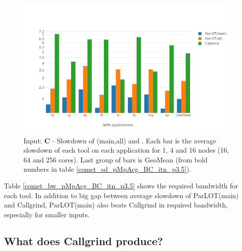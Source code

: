 \begin{figure}[!t]
\centering
\includegraphics[width=6in]{figs.comet/comet_chartAvg_sd_C_p3_5.png}
\caption{ Input: \textbf{C} - Slowdown of \parlot(main,all) and \callgrind. Each bar is the average slowdown of each tool on each application for 1, 4 and 16 nodes (16, 64 and 256 cores). Last group of bars is GeoMean (from bold numbers in table \ref{comet_sd_pMpAcg_BC_itn_p3.5}). 
}
\label{comet_chartAvg_sd_C_p3_5}
\end{figure}





Table \ref{comet_bw_pMpAcg_BC_itn_p3.5} shows the required bandwidth for each tool. In addition to big gap between average slowdown of ParLOT(main) and Callgrind, ParLOT(main) also beats Callgrind in required bandwidth, especially for smaller inputs.

\subsection{What does Callgrind produce?}

